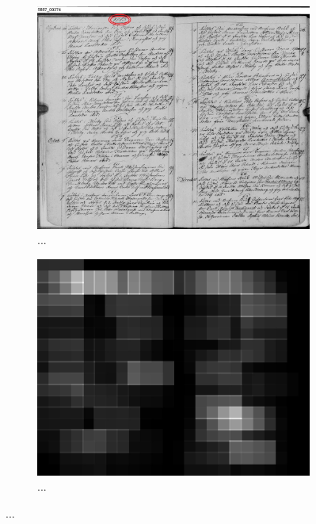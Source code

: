 
\begin{figure}
    \centering
    \begin{subfigure}[c]{0.45\textwidth}
        \centering    \includegraphics[scale=1.0]{resources/SWE_attention/S3HT-64P3-T61.jpg}
        \caption{...}
    \end{subfigure} \quad %
    \begin{subfigure}[c]{0.45\textwidth}
        \centering
        \includegraphics[scale=1.0]{resources/SWE_attention/SoftAtt/att_S3HT-64P3-T61.jpg}
        \caption{...}
    \end{subfigure}


\end{figure}
